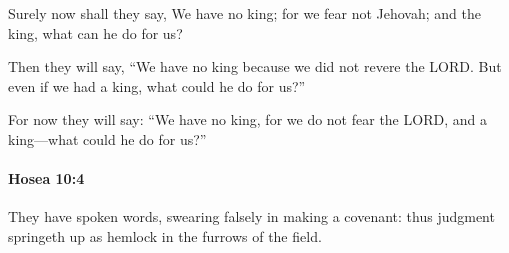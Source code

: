 			\begin{versebox}
					\item[BHS] 
					\item[LXX] 
					\item[ASV] Surely now shall they say, We have no king; for we fear not Jehovah; and the king, what can he do for us?
					\item[NIV] Then they will say, “We have no king because we did not revere the LORD. But even if we had a king, what could he do for us?”
					\item[NRSV] For now they will say: “We have no king, for we do not fear the LORD, and a king—what could he do for us?”
			\end{versebox}

		\paragraph{Hosea 10:4} %
			\label{HOSEA-10-4}

			They have spoken words, swearing falsely in making a covenant: thus judgment springeth up as hemlock in the furrows of the field.

